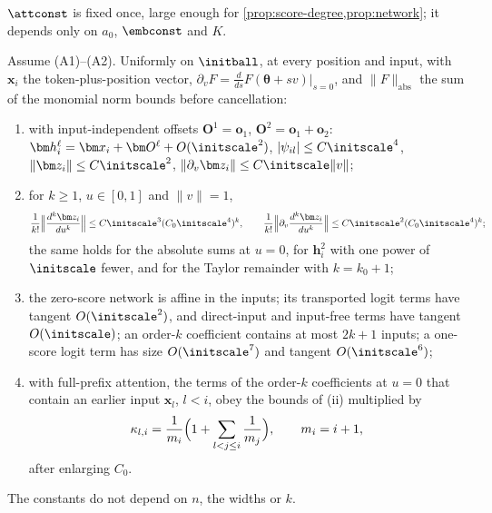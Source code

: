 $\attconst$ is fixed once, large enough for \cref{prop:score-degree,prop:network}; it depends only on $a_0$, $\embconst$ and $K$.

\label{app:network}

\begin{proposition}
\label{prop:network}
Assume (A1)--(A2). Uniformly on $\initball$, at every position and input, with $\bm x_i$ the token-plus-position vector,
$\partial_vF=\frac{d}{ds}F(\bm\theta+sv)|_{s=0}$, and $\|F\|_{\mathrm{abs}}$ the sum of the monomial norm bounds before cancellation:
\begin{enumerate}[label=(\roman*),leftmargin=*,itemsep=1pt,topsep=2pt]
\item with input-independent offsets $\bm O^1=\bm o_1$, $\bm O^2=\bm o_1+\bm o_2$: $\bm h_i^\ell=\bm x_i+\bm O^\ell+O(\initscale^2)$, $|\psi_{il}|\le C\initscale^4$,
$\|\bm z_i\|\le C\initscale^2$, $\|\partial_v\bm z_i\|\le C\initscale\|v\|$;
\item for $k\ge1$, $u\in[0,1]$ and $\|v\|=1$,
\[
 \frac{1}{k!}\Bigl\|\frac{d^k\bm z_i}{du^k}\Bigr\|\le C\initscale^3(C_0\initscale^4)^k,\qquad
 \frac{1}{k!}\Bigl\|\partial_v\frac{d^k\bm z_i}{du^k}\Bigr\|\le C\initscale^2(C_0\initscale^4)^k;
\]
the same holds for the absolute sums at $u=0$, for $\bm h^2_i$ with one power of $\initscale$ fewer, and for the Taylor remainder with $k=k_0+1$;
\item the zero-score network is affine in the inputs; its transported logit terms have tangent $O(\initscale^2)$, and direct-input and
input-free terms have tangent $O(\initscale)$; an order-$k$ coefficient contains at most $2k+1$ inputs; a one-score logit term has size
$O(\initscale^7)$ and tangent $O(\initscale^6)$;
\item with full-prefix attention, the terms of the order-$k$ coefficients at $u=0$ that contain an earlier input $\bm x_l$, $l<i$, obey the
bounds of (ii) multiplied by
\begin{equation}
 \kappa_{l,i}=\frac{1}{m_i}\Bigl(1+\sum_{l<j\le i}\frac{1}{m_j}\Bigr),\qquad m_i=i+1,
 \label{eq:dilution}
\end{equation}
after enlarging $C_0$.
\end{enumerate}
The constants do not depend on $n$, the widths or $k$.
\end{proposition}

